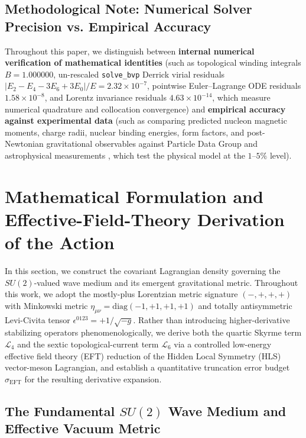 \documentclass[10pt,aps,prd,twocolumn,superscriptaddress,nofootinbib,floatfix,longbibliography,showkeys]{revtex4-2}
\begin{document}
\subsection{Methodological Note: Numerical Solver Precision vs. Empirical Accuracy}\label{sec:1.4}

Throughout this paper, we distinguish between \textbf{internal numerical verification of mathematical identities} (such as topological winding integrals $B = 1.000000$, un-rescaled \texttt{solve\_bvp} Derrick virial residuals $|E_2 - E_4 - 3E_6 + 3E_0|/E = 2.32 \times 10^{-7}$, pointwise Euler--Lagrange ODE residuals $1.58 \times 10^{-8}$, and Lorentz invariance residuals $4.63 \times 10^{-14}$, which measure numerical quadrature and collocation convergence) and \textbf{empirical accuracy against experimental data} (such as comparing predicted nucleon magnetic moments, charge radii, nuclear binding energies, form factors, and post-Newtonian gravitational observables against Particle Data Group \cite{ref19,ref20} and astrophysical measurements \cite{ref21,ref28,ref29}, which test the physical model at the $1\text{--}5\%$ level).



\section{Mathematical Formulation and Effective-Field-Theory Derivation of the Action}\label{sec:2}

In this section, we construct the covariant Lagrangian density governing the $SU(2)$-valued wave medium and its emergent gravitational metric. Throughout this work, we adopt the mostly-plus Lorentzian metric signature $(-,+,+,+)$ with Minkowski metric $\eta_{\mu\nu} = \text{diag}(-1, +1, +1, +1)$ and totally antisymmetric Levi-Civita tensor $\epsilon^{0123} = +1/\sqrt{-g}$. Rather than introducing higher-derivative stabilizing operators phenomenologically, we derive both the quartic Skyrme term $\mathcal{L}_4$ and the sextic topological-current term $\mathcal{L}_6$ via a controlled low-energy effective field theory (EFT) reduction of the Hidden Local Symmetry (HLS) vector-meson Lagrangian, and establish a quantitative truncation error budget $\sigma_{\text{EFT}}$ for the resulting derivative expansion.


\subsection{The Fundamental $SU(2)$ Wave Medium and Effective Vacuum Metric}\label{sec:2.1}
\end{document}
